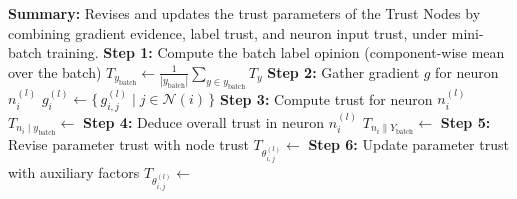 \begin{algorithm}
\caption{Parameter-Trust Update Algorithm}
\begin{algorithmic}[1]

        \Statex \hspace{\algorithmicindent}\textbf{Summary:} Revises and updates the trust parameters of the Trust Nodes by combining gradient evidence, label trust, and neuron input trust, under mini-batch training.
        \Statex \hspace{\algorithmicindent}\textbf{Step 1:} Compute the batch label opinion (component-wise mean over the batch)
        \State $T_{y_\text{batch}}  \longleftarrow  \frac{1}{|y_\text{batch}|}\sum_{y \in y_\text{batch}} T_y$ \label{alg:l:ybatch}
                \Statex \hspace{3\dimexpr\algorithmicindent\relax}\textbf{Step 2:} Gather gradient $g$ for neuron $n_i^{(l)}$
                \State $g^{(l)}_i  \longleftarrow  \{\, g^{(l)}_{i,j} \;|\; j \in \mathcal{N}(i)\,\}$ \label{alg:l:grad}
                \Statex \hspace{3\dimexpr\algorithmicindent\relax}\textbf{Step 3:} Compute trust for neuron $n_i^{(l)}$
                \State $T_{n_i \mid y_\text{batch}}  \longleftarrow $  \label{alg:l:nodetrust}
                \Statex \hspace{3\dimexpr\algorithmicindent\relax}\textbf{Step 4:} Deduce overall trust in neuron $n_i^{(l)}$
                \State $T_{n_i \parallel Y_\text{batch}}  \longleftarrow $  \label{alg:l:deduce}
                    \Statex \hspace{4\dimexpr\algorithmicindent\relax}\textbf{Step 5:} Revise parameter trust with node trust
                    \State $T_{\theta_{i,j}^{(l)}}  \longleftarrow $  \label{alg:l:revise}
                    \Statex \hspace{4\dimexpr\algorithmicindent\relax}\textbf{Step 6:} Update parameter trust with auxiliary factors
                    \State $T_{\theta_{i,j}^{(l)}} \longleftarrow $  \label{alg:l:update}
                \EndFor
            \EndFor
        \EndFor
    \EndFunction


\end{algorithmic}
\end{algorithm}
